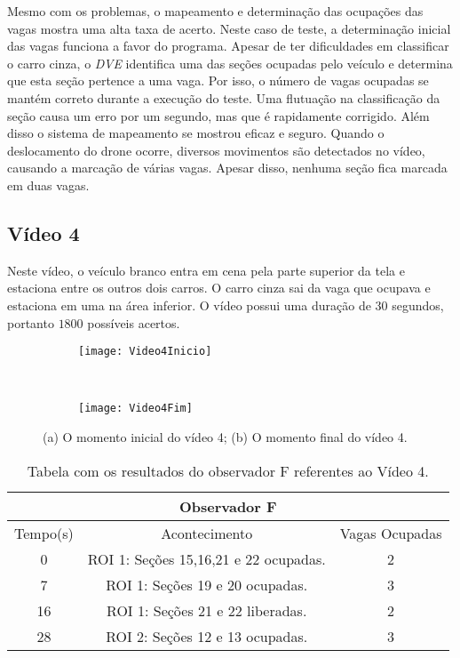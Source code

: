 Mesmo com os problemas, o mapeamento e determinação das ocupações das vagas mostra uma alta taxa de acerto. Neste caso de teste, a determinação inicial das vagas funciona a favor do programa. Apesar de ter dificuldades em classificar o carro cinza, o \textit{DVE} identifica uma das seções ocupadas pelo veículo e determina que esta seção pertence a uma vaga. Por isso, o número de vagas ocupadas se mantém correto durante a execução do teste. Uma flutuação na classificação da seção causa um erro por um segundo, mas que é rapidamente corrigido. Além disso o sistema de mapeamento se mostrou eficaz e seguro. Quando o deslocamento do drone ocorre, diversos movimentos são detectados no vídeo, causando a marcação de várias vagas. Apesar disso, nenhuma seção fica marcada em duas vagas.



\subsection{Vídeo 4}

Neste vídeo, o veículo branco entra em cena pela parte superior da tela e estaciona entre os outros dois carros. O carro cinza sai da vaga que ocupava e estaciona em uma na área inferior. O vídeo possui uma duração de $30$ segundos, portanto $1800$ possíveis acertos.

\begin{figure}[H]
\centering
\begin{subfigure}{.5\textwidth}
\centering
\texttt{[image: Video4Inicio]}
\caption{}
\end{subfigure}\
\begin{subfigure}{.5\textwidth}
\centering
\texttt{[image: Video4Fim]}
\caption{}
\end{subfigure}
\centering
\caption{(a) O momento inicial do vídeo 4; (b) O momento final do vídeo 4.}%
\label{}%
\end{figure}

\begin{table}[H]
\begin{center}
\begin{tabular}{|c||c||c|}
\hline
\multicolumn{3}{|c|}{Observador F}  \\ \hline \hline
Tempo(s) & Acontecimento & Vagas Ocupadas\\ \hline
0 & ROI 1: Seções 15,16,21 e 22 ocupadas. & 2 \\ \hline
7 & ROI 1: Seções 19 e 20 ocupadas. & 3 \\ \hline
16 & ROI 1: Seções 21 e 22 liberadas. & 2 \\ \hline
28 & ROI 2: Seções 12 e 13 ocupadas. & 3 \\
\hline
\end{tabular}
\end{center}
\caption{Tabela com os resultados do observador F referentes ao Vídeo 4.}
\label{tab:video4F}
\end{table}

